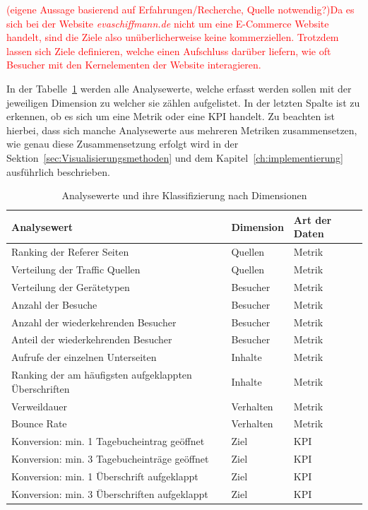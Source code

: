 \textcolor{red}{
    (eigene Aussage basierend auf Erfahrungen/Recherche, Quelle notwendig?)Da es sich bei der Website \textit{evaschiffmann.de} nicht um eine E-Commerce Website handelt, sind die Ziele also unüberlicherweise keine kommerziellen. Trotzdem lassen sich Ziele definieren, welche einen Aufschluss darüber liefern, wie oft Besucher mit den Kernelementen der Website interagieren.
}

In der Tabelle~\ref{tab:analysewerte} werden alle Analysewerte, welche erfasst werden sollen mit der jeweiligen Dimension zu welcher sie zählen aufgelistet. In der letzten Spalte ist zu erkennen, ob es sich um eine Metrik oder eine KPI handelt. Zu beachten ist hierbei, dass sich manche Analysewerte aus mehreren Metriken zusammensetzen, wie genau diese Zusammensetzung erfolgt wird in der Sektion~\ref{sec:Visualisierungsmethoden} und dem Kapitel~\ref{ch:implementierung} ausführlich beschrieben.

\begin{table}[H]
    \centering
    \begin{tabularx}{\textwidth}{l l l}
        \hline
        \textbf{Analysewert} & \textbf{Dimension} & \textbf{Art der Daten} \\
        \hline
        Ranking der Referer Seiten & Quellen & Metrik \\
        Verteilung der Traffic Quellen & Quellen & Metrik \\
        Verteilung der Gerätetypen & Besucher & Metrik \\
        Anzahl der Besuche & Besucher & Metrik \\
        Anzahl der wiederkehrenden Besucher & Besucher & Metrik \\
        Anteil der wiederkehrenden Besucher & Besucher & Metrik \\
        Aufrufe der einzelnen Unterseiten & Inhalte & Metrik \\
        Ranking der am häufigsten aufgeklappten Überschriften & Inhalte & Metrik \\
        Verweildauer & Verhalten & Metrik \\
        Bounce Rate & Verhalten & Metrik \\
        Konversion: min. 1 Tagebucheintrag geöffnet & Ziel & KPI \\
        Konversion: min. 3 Tagebucheinträge geöffnet & Ziel & KPI \\
        Konversion: min. 1 Überschrift aufgeklappt & Ziel & KPI \\
        Konversion: min. 3 Überschriften aufgeklappt & Ziel & KPI \\
        \hline
    \end{tabularx}
    \caption{Analysewerte und ihre Klassifizierung nach Dimensionen}
    \label{tab:analysewerte}
\end{table}

